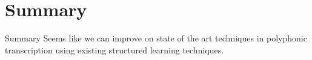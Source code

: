 \documentclass{beamer}
\begin{document}
\section{Summary}
\begin{frame}{Summary}
Seems like we can improve on state of the art techniques in polyphonic transcription using existing structured learning techniques. 
\end{frame}
\end{document}
